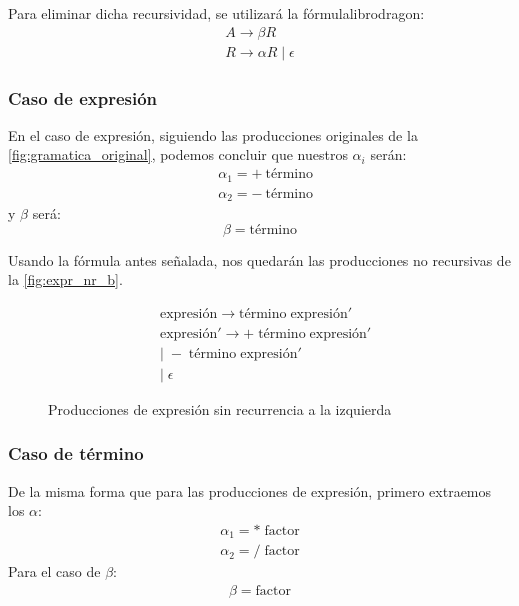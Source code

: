 \documentclass[a4paper,twocolumn]{article}
\begin{document}
    Para eliminar dicha recursividad, se utilizará la fórmula{librodragon}:
    \begin{gather*}
        A \rightarrow \beta R\\
        R \rightarrow \alpha R \; \vert \; \epsilon
    \end{gather*}

    \subsubsection{Caso de expresión}
    En el caso de expresión, siguiendo las producciones originales de la \autoref{fig:gramatica_original}, podemos concluir que nuestros $ \alpha_i $ serán:
    \begin{align*}
        &\alpha_1 = + \: \text{término}\\
        &\alpha_2 = - \: \text{término}
    \end{align*}
    y $ \beta $ será:
    \[\beta = \text{término}\]

    Usando la fórmula antes señalada, nos quedarán las producciones no recursivas de la \autoref{fig:expr_nr_b}.

    \begin{figure}[h]
        \begin{align}
            &\text{expresión} \rightarrow \text{término} \; \text{expresión}' \\
            &\text{expresión}' \rightarrow + \; \text{término} \; \text{expresión}' \\
            &\vert \; - \; \text{término} \; \text{expresión}' \\
            &\vert \; \epsilon
        \end{align}

        \caption{Producciones de expresión sin recurrencia a la izquierda}
        \label{fig:expr_nr_b}
    \end{figure}

    \subsubsection{Caso de término}
    De la misma forma que para las producciones de expresión, primero extraemos los $\alpha$:
    \begin{align}
        \alpha_1 = * \; \text{factor}\nonumber \\
        \alpha_2 = / \; \text{factor}\nonumber
    \end{align}
    Para el caso de $\beta$:
    \begin{align}
        \beta = \text{factor} \nonumber
    \end{align}
\end{document}
